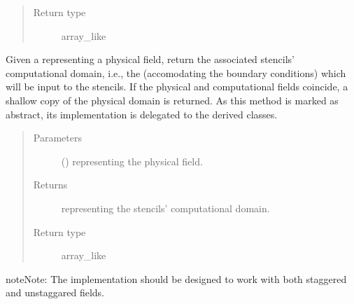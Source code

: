 \documentclass[letterpaper,10pt,english]{sphinxmanual}
\begin{document}
\begin{fulllineitems}
\begin{fulllineitems}
\begin{quote}
\begin{description}
\item[{Return type}] \leavevmode
array\_like

\end{description}\end{quote}

\end{fulllineitems}


\begin{fulllineitems}
\label{\detokenize{api:tasmania.dycore.horizontal_boundary.HorizontalBoundary.from_physical_to_computational_domain}}
Given a  representing a physical field, return the associated stencils’ computational
domain, i.e., the  (accomodating the boundary conditions) which will be input
to the stencils. If the physical and computational fields coincide, a shallow copy of the physical
domain is returned.
As this method is marked as abstract, its implementation is delegated to the derived classes.
\begin{quote}\begin{description}
\item[{Parameters}] \leavevmode
{} () \textendash{}  representing the physical field.

\item[{Returns}] \leavevmode
{} representing the stencils’ computational domain.

\item[{Return type}] \leavevmode
array\_like

\end{description}\end{quote}

\begin{sphinxadmonition}{note}{Note:}
The implementation should be designed to work with both staggered and unstaggared fields.
\end{sphinxadmonition}


\end{fulllineitems}
\end{fulllineitems}
\end{document}
